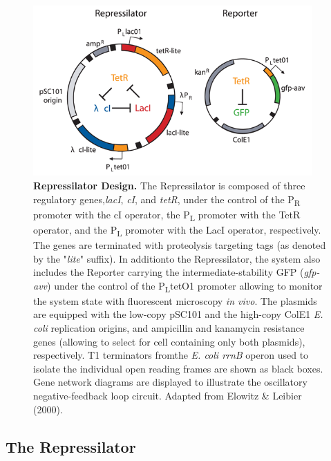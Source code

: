\documentclass[runningheads,a4paper]{llncs}
\begin{document}
\begin{figure}[H]
    \singlespacing
    \centering
    \includegraphics[width=0.95\textwidth]{fig/Repressilator_plasmid.png}
    \caption{\textbf{Repressilator Design.} The Repressilator is composed of three regulatory genes,\linebreak \textit{lacI}, \textit{cI}, and \textit{tetR}, under the control of the P\textsubscript{R} promoter with the cI operator, the P\textsubscript{L} promoter with the TetR operator, and the P\textsubscript{L} promoter with the LacI operator, respectively. The genes are terminated with proteolysis targeting tags (as denoted by the "\textit{lite}" suffix). In addition\linebreak to the Repressilator, the system also includes the Reporter carrying the intermediate-stability GFP (\textit{gfp-avv}) under the control of the P\textsubscript{L}tetO1 promoter allowing to monitor the system state with fluorescent microscopy \textit{in vivo}. The plasmids are equipped with the low-copy pSC101 and the high-copy ColE1 \textit{E. coli} replication origins, and ampicillin and kanamycin resistance genes (allowing to select for cell containing only both plasmids), respectively. T1 terminators from\linebreak the \textit{E. coli rrnB} operon used to isolate the individual open reading frames are shown as black boxes. Gene network diagrams are displayed to illustrate the oscillatory negative-feedback loop circuit. Adapted from Elowitz \& Leibier (2000)\cite{Elowitz2000d}.}
    \label{fig:fig1}
\end{figure}

\subsection*{The Repressilator}
\end{document}
